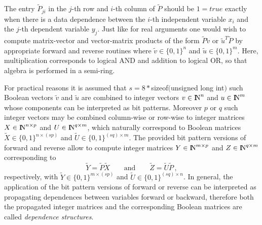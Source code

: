 \documentclass[11pt,twoside]{article}
\newcommand{\N}{{ {\rm I} \kern -.225em {\rm N} }}
\begin{document}
The entry $\tilde{P}_{ji}$ in the $j$-th row and $i$-th column 
of $\tilde{P}$ should be $1 = true$ exactly when there is a data 
dependence between the $i$-th independent variable $x_{i}$ and 
the $j$-th dependent variable $y_{j}$. Just like for real arguments 
one would wish to compute matrix-vector and vector-matrix products 
of the form $\tilde{P}\tilde{v}$ or $\tilde{u}^{T}\tilde{P}$ 
by appropriate {\sf forward} and {\sf reverse} routines where 
$\tilde{v}\in\{0,1\}^{n}$ and $\tilde{u}\in\{0,1\}^{m}$. 
Here, multiplication corresponds to logical
{\sf AND} and addition to logical {\sf OR}, so that algebra is performed in a
semi-ring.

For practical reasons it is assumed that 
$s=8*${\sf sizeof}$(${\sf unsigned long int}$)$ such Boolean vectors 
$\tilde{v}$ and $\tilde{u}$ are combined to integer vectors 
$v\in\N^{n}$ and $u\in\N^{m}$ whose components can be interpreted 
as bit patterns. Moreover $p$ or $q$ such integer vectors may 
be combined column-wise or row-wise to integer matrices $X\in\N^{n \times p}$ 
and $U\in\N^{q \times m}$, which naturally correspond
to Boolean matrices $\tilde{X}\in\{0,1\}^{n\times\left(sp\right)}$
and $\tilde{U}\in\{0,1\}^{\left(sq\right)\times m}$. The provided
bit pattern versions of {\sf forward} and {\sf reverse} allow
to compute integer matrices $Y\in\N^{m \times p}$ and
$Z\in\N^{q \times m}$ corresponding to
\begin{equation}
\label{eq:int_forrev}
\tilde{Y} = \tilde{P}\tilde{X} \qquad \mbox{and} \qquad 
\tilde{Z} = \tilde{U}\tilde{P} \, ,
\end{equation} 
respectively, with $\tilde{Y}\in\{0,1\}^{m\times\left(sp\right)}$
and $\tilde{U}\in\{0,1\}^{\left(sq\right)\times n}$.
In general, the application of the bit pattern versions of
{\sf forward} or {\sf reverse} can be interpreted as 
propagating dependences between variables forward or backward, therefore 
both the propagated integer matrices and the corresponding
Boolean matrices are called {\em dependence structures}.
 
\end{document}
